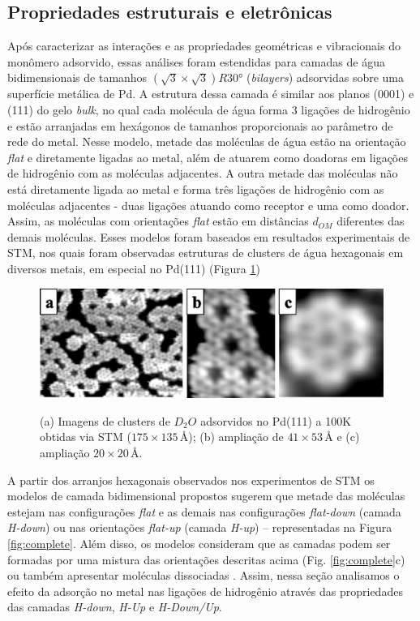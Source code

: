 \subsection*{Propriedades estruturais e eletrônicas}
Após caracterizar as interações e as propriedades geométricas e vibracionais do monômero adsorvido, essas análises foram estendidas para camadas de água bidimensionais de tamanhos $ (\sqrt{3}\times\sqrt{3})R30\si{\degree} $ (\textit{bilayers}) adsorvidas sobre uma superfície metálica de Pd. A estrutura dessa camada é similar aos planos (0001) e (111) do gelo \textit{bulk}, no qual cada molécula de água forma 3 ligações de hidrogênio e estão arranjadas em hexágonos de tamanhos proporcionais ao parâmetro de rede do metal. Nesse modelo, metade das moléculas de água estão na orientação \textit{flat} e diretamente ligadas ao metal, além de atuarem como doadoras em ligações de hidrogênio com as moléculas adjacentes. A outra metade das moléculas não está diretamente ligada ao metal e forma três ligações de hidrogênio com as moléculas adjacentes - duas ligações atuando como receptor e uma como doador. Assim, as moléculas com orientações \textit{flat} estão em distâncias $ d_{OM} $ diferentes das demais moléculas. Esses modelos foram baseados em resultados experimentais de STM, nos quais foram observadas estruturas de clusters de água hexagonais em diversos metais, em especial no Pd(111) (Figura \ref{fig:layer_stm})  \cite{layer_dft,review,review2,review_new}

\begin{figure}[H]
	\centering
	\caption{(a) Imagens de clusters de $ D_2O $ adsorvidos no Pd(111) a 100K obtidas via STM ($ 175\times135\,\si{\angstrom} $); (b) ampliação de $ 41\times53\,\si{\angstrom} $ e (c) ampliação $ 20\times20\,\si{\angstrom} $.}
	\includegraphics[scale=0.7]{figs/layer_stm.png}
	\label{fig:layer_stm}
\end{figure}  

A partir dos arranjos hexagonais observados nos experimentos de STM os modelos de camada bidimensional propostos sugerem que metade das moléculas estejam nas configurações \textit{flat} e as demais nas configurações \textit{flat-down} (camada \textit{H-down}) ou nas orientações \textit{flat-up} (camada \textit{H-up}) -- representadas na Figura \ref{fig:complete}. Além disso, os modelos consideram que as camadas podem ser formadas por uma mistura das orientações descritas acima (Fig. \ref{fig:complete}c) ou também apresentar moléculas dissociadas \cite{layer_dft}. Assim, nessa seção analisamos o efeito da adsorção no metal nas ligações de hidrogênio através das propriedades das camadas \textit{H-down}, \textit{H-Up} e \textit{H-Down/Up}.


